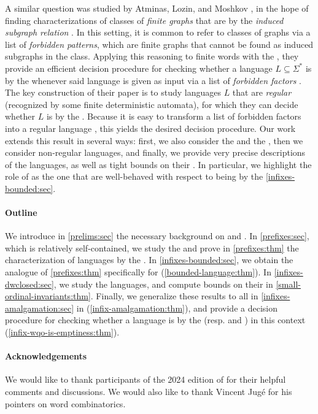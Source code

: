 A similar question was studied by Atminas, Lozin, and Moshkov \cite{ALM17}, in
the hope of finding characterizations of classes of \emph{finite graphs} that
are  by the \emph{induced subgraph relation}
\cite[Section 7]{ALM17}. In this setting, it is common to refer to classes of
graphs via a list of \emph{forbidden patterns}, which are finite graphs that
cannot be found as induced subgraphs in the class. Applying this reasoning to
finite words with the , they provide an efficient decision
procedure for checking whether a language $L \subseteq \Sigma^*$ is
 by the  whenever said language is
given as input via a list of \emph{forbidden factors} \cite[Theorem 1, Theorem
2]{ALM17}. The key construction of their paper is to study languages $L$ that
are \emph{regular} (recognized by some finite deterministic automata), for
which they can decide whether $L$ is  by the  \cite[Theorem 1]{ALM17}. Because it is easy to transform a list of
forbidden factors into a regular language \cite[Theorem 1]{ALM17}, this yields
the desired decision procedure. Our work extends this result in several ways:
first, we also consider the  and the ,
then we consider non-regular languages, and finally, we provide very precise
descriptions of the  languages, as well as tight bounds
on their . In particular, we highlight the role of
 as the one that are well-behaved with respect to being
 by the  \cref{infixes-bounded:sec}.

\paragraph*{Outline} 
We introduce in \cref{prelims:sec} the
necessary background on  and .
In
\cref{prefixes:sec}, which is relatively
self-contained, we study the  and prove in
\cref{prefixes:thm} the characterization of 
languages by the . In
\cref{infixes-bounded:sec}, we
obtain the  analogue of \cref{prefixes:thm}
specifically for 
(\cref{bounded-language:thm}). 
In \cref{infixes-dwclosed:sec}, we study the 
languages, and compute bounds on their  in \cref{small-ordinal-invariants:thm}.
Finally, 
we generalize these results to all
 in \cref{infixes-amalgamation:sec}
in
(\cref{infix-amalgamation:thm}),
and provide a decision procedure for checking whether a language is
 by the  (resp.  and ) in
this context (\cref{infix-wqo-is-emptiness:thm}).

\paragraph*{Acknowledgements} We would like to thank participants of the 2024
edition of  for their helpful comments and discussions.
We would also like to thank Vincent Jugé for his pointers on word combinatorics.
